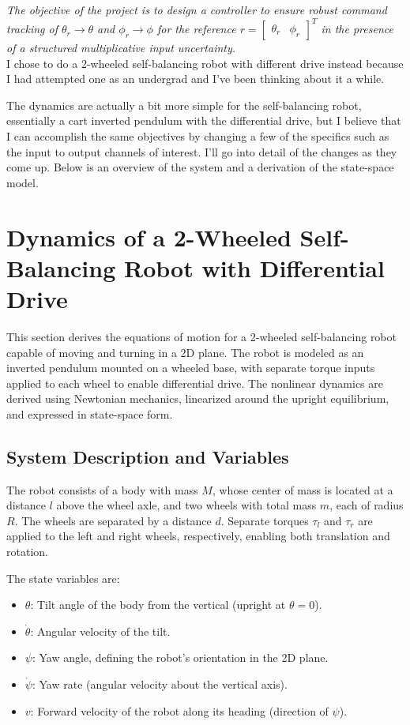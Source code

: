 \documentclass{article}
\begin{document}
\textit{The objective of the project is to design a controller to ensure robust command tracking of $\theta_r \rightarrow \theta$ and $\phi_r \rightarrow \phi$ for the reference $r=\begin{bmatrix} \theta_r & \phi_r \end{bmatrix}^T$ in the presence of a structured multiplicative input uncertainty.} \\

I chose to do a 2-wheeled self-balancing robot with different drive instead because I had attempted one as an undergrad and I've been thinking about it a while.

The dynamics are actually a bit more simple for the self-balancing robot, essentially a cart inverted pendulum with the differential drive, but I believe that I can accomplish the same objectives by changing a few of the specifics such as the input to output channels of interest.
I'll go into detail of the changes as they come up.
Below is an overview of the system and a derivation of the state-space model.

\section*{Dynamics of a 2-Wheeled Self-Balancing Robot with Differential Drive}

This section derives the equations of motion for a 2-wheeled self-balancing robot capable of moving and turning in a 2D plane. The robot is modeled as an inverted pendulum mounted on a wheeled base, with separate torque inputs applied to each wheel to enable differential drive. The nonlinear dynamics are derived using Newtonian mechanics, linearized around the upright equilibrium, and expressed in state-space form.

\subsection{System Description and Variables}

The robot consists of a body with mass \( M \), whose center of mass is located at a distance \( l \) above the wheel axle, and two wheels with total mass \( m \), each of radius \( R \). The wheels are separated by a distance \( d \). Separate torques \( \tau_l \) and \( \tau_r \) are applied to the left and right wheels, respectively, enabling both translation and rotation.

The state variables are:
\begin{itemize}
    \item \( \theta \): Tilt angle of the body from the vertical (upright at \( \theta = 0 \)).
    \item \( \dot{\theta} \): Angular velocity of the tilt.
    \item \( \psi \): Yaw angle, defining the robot's orientation in the 2D plane.
    \item \( \dot{\psi} \): Yaw rate (angular velocity about the vertical axis).
    \item \( v \): Forward velocity of the robot along its heading (direction of \( \psi \)).
\end{itemize}
\end{document}

